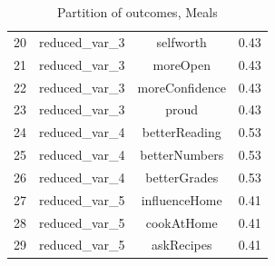 \begin{frame}[fragile]
\begin{itemize}
\begin{frame}
\begin{itemize}
\begin{frame}[fragile]
\begin{table}[ht]
\begin{tabular}{lccc}
  20 & reduced\_var\_3 & selfworth & 0.43 \\ 
  21 & reduced\_var\_3 & moreOpen & 0.43 \\ 
  22 & reduced\_var\_3 & moreConfidence & 0.43 \\ 
  23 & reduced\_var\_3 & proud & 0.43 \\ 
  24 & reduced\_var\_4 & betterReading & 0.53 \\ 
  25 & reduced\_var\_4 & betterNumbers & 0.53 \\ 
  26 & reduced\_var\_4 & betterGrades & 0.53 \\ 
  27 & reduced\_var\_5 & influenceHome & 0.41 \\ 
  28 & reduced\_var\_5 & cookAtHome & 0.41 \\ 
  29 & reduced\_var\_5 & askRecipes & 0.41 \\ 
   \hline
\end{tabular}
\caption{Partition of outcomes, Meals} 
\label{partitionmeals}
\end{table}


 \end{frame}


\end{itemize}
\end{frame}
\end{itemize}
\end{frame}
